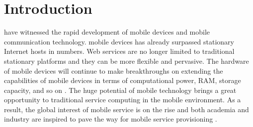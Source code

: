 \documentclass[10pt,journal,compsoc]{IEEEtran}
\begin{document}
\maketitle



\IEEEdisplaynontitleabstractindextext

\IEEEpeerreviewmaketitle


\ifCLASSOPTIONcompsoc
{}
\else
\section{Introduction}
\label{sec:introduction}
\fi


 have witnessed the rapid development of mobile devices and mobile communication technology. 
mobile devices has already surpassed stationary Internet hosts in numbers. Web services are no longer limited to traditional stationary platforms and they can be more flexible and pervasive. The hardware of mobile devices will continue to make breakthroughs on extending the capabilities of mobile devices in terms of computational power, RAM, storage capacity, and so on \cite{Deng2017}. The huge potential of mobile technology brings a great opportunity to traditional service computing in the mobile environment. As a result, the global interest of mobile service is on the rise and both academia and industry are inspired to pave the way for mobile service provisioning \cite{dinh2013survey,hu2014multidimensional}.
\end{document}
